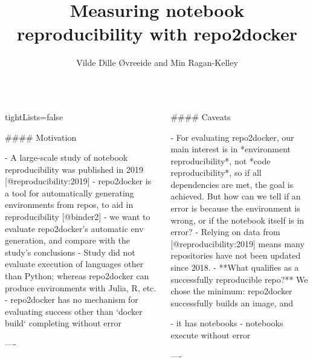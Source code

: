 \documentclass{beamer}
\author[]{Vilde Dille Øvreeide and Min Ragan-Kelley}
\institute[simula]{Simula Research Laboratory}
\title{Measuring notebook reproducibility with repo2docker}
\begin{document}
\begin{frame}[fragile]\centering

\begin{columns}
\begin{column}{0.5\textwidth}

\begin{markdown}{tightLists=false}

#### Motivation


- A large-scale study of notebook reproducibility was published in 2019 [@reproducibility:2019]
- repo2docker is a tool for automatically generating environments from repos, to aid in reproducibility [@binder2]
- we want to evaluate repo2docker's automatic env generation,
  and compare with the study's conclusions
- Study did not evaluate execution of languages other than Python;
  whereas repo2docker can produce environments with Julia, R, etc.
- repo2docker has no mechanism for evaluating success other than `docker build` completing without error


----
\end{markdown}
\end{column}

\begin{column}{.5\textwidth}
\begin{markdown}


#### Caveats

- For evaluating repo2docker, our main interest is in *environment reproducibility*,
  not *code reproducibility*,
  so if all dependencies are met, the goal is achieved.
  But how can we tell if an error is because the environment is wrong,
  or if the notebook itself is in error?
- Relying on data from [@reproducibility:2019] means many repositories have not been updated since 2018.
- **What qualifies as a successfully reproducible repo?**
  We chose the minimum: repo2docker successfully builds an image, and

    - it has notebooks
    - notebooks execute without error

----

\end{markdown}
\end{column}

\end{columns}

\bigskip
{\hrulefill}
\bigskip

\begin{columns}[T]

\begin{column}{.3\textwidth}


\end{column}
\end{columns}
\end{frame}
\end{document}
